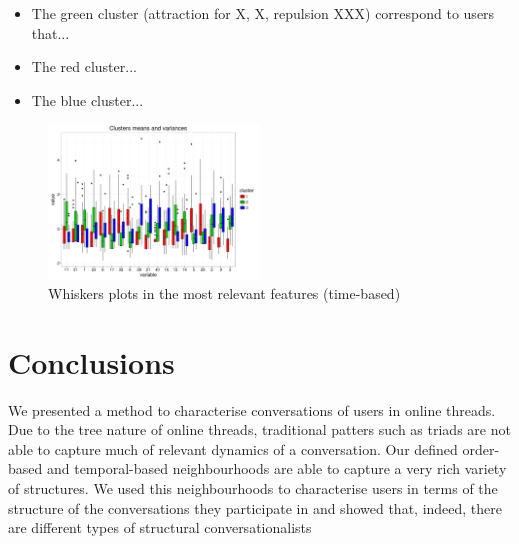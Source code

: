 \documentclass[conference]{IEEEtran}
\begin{document}
\begin{itemize}
\item The green cluster (attraction for X, X, repulsion XXX) correspond to users that...
\item The red cluster...
\item The blue cluster...
\end{itemize}

\begin{figure}
	\centering
	\includegraphics[width=0.5\textwidth]{whiskers}
	\caption{Whiskers plots in the most relevant features (time-based)}
	\label{fig:whiskers}
\end{figure}









\section{Conclusions}
We presented a method to characterise conversations of users in online threads. Due to the tree nature of online threads, traditional patters such as triads are not able to capture much of relevant dynamics of a conversation. Our defined order-based and temporal-based neighbourhoods 
are able to capture a very rich variety of structures. We used this neighbourhoods to characterise users in terms of the structure of the conversations they participate in and showed that, indeed, there are different types of structural conversationalists
\end{document}
